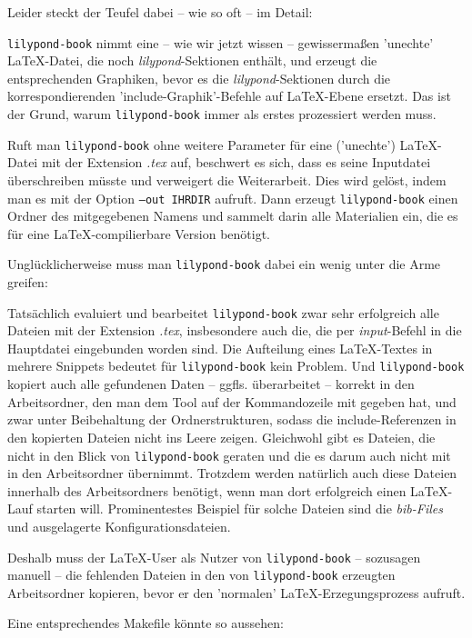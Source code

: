 Leider steckt der Teufel dabei -- wie so oft -- im Detail: 

\label{LilyPondGraphics}\texttt{lilypond-book} nimmt eine -- wie wir jetzt
wissen -- gewissermaßen 'unechte' \LaTeX-Datei, die noch
\textit{lilypond}-Sektionen enthält, und erzeugt die entsprechenden Graphiken,
bevor es die \textit{lilypond}-Sektionen durch die korrespondierenden
'include-Graphik'-Befehle auf \LaTeX-Ebene ersetzt. Das ist der Grund, warum
\texttt{lilypond-book} immer als erstes prozessiert werden muss.

Ruft man \texttt{lilypond-book} ohne weitere Parameter für eine ('unechte')
\LaTeX-Datei mit der Extension \textit{.tex} auf, beschwert es sich, dass es seine
Inputdatei überschreiben müsste und verweigert die Weiterarbeit. Dies wird
gelöst, indem man es mit der Option \texttt{--out IHRDIR} aufruft. Dann erzeugt
\texttt{lilypond-book} einen Ordner des mitgegebenen Namens und sammelt darin
alle Materialien ein, die es für eine \LaTeX-compilierbare Version benötigt.

Unglücklicherweise muss man \texttt{lilypond-book} dabei ein wenig unter die Arme
greifen:

Tatsächlich evaluiert und bearbeitet \texttt{lilypond-book} zwar sehr
erfolgreich alle Dateien mit der Extension \textit{.tex}, insbesondere auch die,
die per \textit{input}-Befehl in die Hauptdatei eingebunden worden sind. Die
Aufteilung eines LaTeX-Textes in mehrere Snippets bedeutet für
\texttt{lilypond-book} kein Problem. Und \texttt{lilypond-book} kopiert auch
alle gefundenen Daten -- ggfls. überarbeitet -- korrekt in den Arbeitsordner,
den man dem Tool auf der Kommandozeile mit gegeben hat, und zwar unter
Beibehaltung der Ordnerstrukturen, sodass die include-Referenzen in den
kopierten Dateien nicht ins Leere zeigen. Gleichwohl gibt es Dateien, die nicht
in den Blick von \texttt{lilypond-book} geraten und die es darum auch nicht mit
in den Arbeitsordner übernimmt. Trotzdem werden natürlich auch diese Dateien
innerhalb des Arbeitsordners benötigt, wenn man dort erfolgreich einen
\LaTeX-Lauf starten will. Prominentestes Beispiel für solche Dateien sind die
\textit{bib-Files} und ausgelagerte Konfigurationsdateien.

Deshalb muss der \LaTeX-User als Nutzer von \texttt{lilypond-book} -- sozusagen
manuell -- die fehlenden Dateien in den von \texttt{lilypond-book} erzeugten
Arbeitsordner kopieren, bevor er den 'normalen' \LaTeX-Erzegungsprozess aufruft.

Eine entsprechendes Makefile könnte so aussehen:


